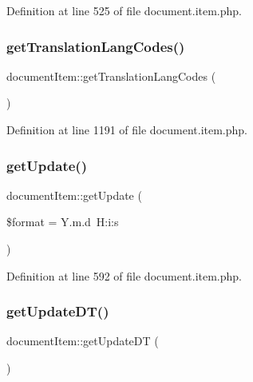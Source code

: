 Definition at line 525 of file document.\+item.\+php.

\hypertarget{classdocumentItem_afd284f32681755444c28e93c14f55c28}{}\label{classdocumentItem_afd284f32681755444c28e93c14f55c28} 
\subsubsection{\texorpdfstring{get\+Translation\+Lang\+Codes()}{getTranslationLangCodes()}}
{\footnotesize\ttfamily document\+Item\+::get\+Translation\+Lang\+Codes (\begin{DoxyParamCaption}{ }\end{DoxyParamCaption})}



Definition at line 1191 of file document.\+item.\+php.

\hypertarget{classdocumentItem_ae9c92871b66c8f9d93140775d90b88d1}{}\label{classdocumentItem_ae9c92871b66c8f9d93140775d90b88d1} 
\subsubsection{\texorpdfstring{get\+Update()}{getUpdate()}}
{\footnotesize\ttfamily document\+Item\+::get\+Update (\begin{DoxyParamCaption}\item[{}]{\$format = {\ttfamily \textquotesingle{}Y.m.d~H\+:i\+:s\textquotesingle{}} }\end{DoxyParamCaption})}



Definition at line 592 of file document.\+item.\+php.

\hypertarget{classdocumentItem_a05139ae1f3934a4db14e4d73b504f534}{}\label{classdocumentItem_a05139ae1f3934a4db14e4d73b504f534} 
\subsubsection{\texorpdfstring{get\+Update\+D\+T()}{getUpdateDT()}}
{\footnotesize\ttfamily document\+Item\+::get\+Update\+DT (\begin{DoxyParamCaption}{ }\end{DoxyParamCaption})}




